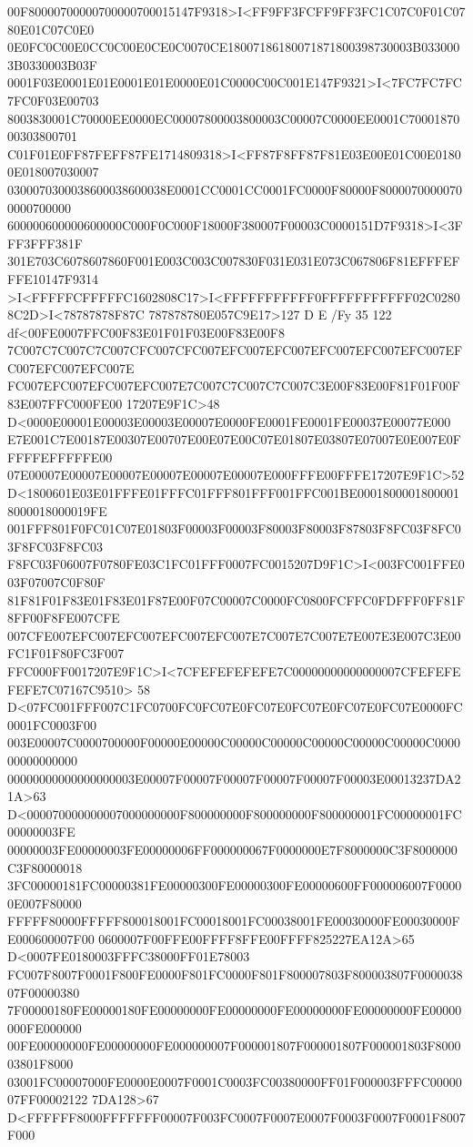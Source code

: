 00F80000700000700000700015147F9318>I<FF9FF3FCFF9FF3FC1C07C0F01C0780E01C07C0E0
0E0FC0C00E0CC0C00E0CE0C0070CE18007186180071871800398730003B0330003B0330003B03F
0001F03E0001E01E0001E01E0000E01C0000C00C001E147F9321>I<7FC7FC7FC7FC0F03E00703
8003830001C70000EE0000EC00007800003800003C00007C0000EE0001C7000187000303800701
C01F01E0FF87FEFF87FE1714809318>I<FF87F8FF87F81E03E00E01C00E01800E018007030007
0300070300038600038600038E0001CC0001CC0001FC0000F80000F80000700000700000700000
600000600000600000C000F0C000F18000F380007F00003C0000151D7F9318>I<3FFF3FFF381F
301E703C6078607860F001E003C003C007830F031E031E073C067806F81EFFFEFFFE10147F9314
>I<FFFFFCFFFFFC1602808C17>I<FFFFFFFFFFF0FFFFFFFFFFF02C02808C2D>I<78787878F87C
787878780E057C9E17>127 D E /Fy 35 122 df<00FE0007FFC00F83E01F01F03E00F83E00F8
7C007C7C007C7C007CFC007CFC007EFC007EFC007EFC007EFC007EFC007EFC007EFC007EFC007E
FC007EFC007EFC007EFC007E7C007C7C007C7C007C3E00F83E00F81F01F00F83E007FFC000FE00
17207E9F1C>48 D<0000E00001E00003E00003E00007E0000FE0001FE0001FE00037E00077E000
E7E001C7E00187E00307E00707E00E07E00C07E01807E03807E07007E0E007E0FFFFFEFFFFFE00
07E00007E00007E00007E00007E00007E00007E000FFFE00FFFE17207E9F1C>52
D<1800601E03E01FFFE01FFFC01FFF801FFF001FFC001BE00018000018000018000018000019FE
001FFF801F0FC01C07E01803F00003F00003F80003F80003F87803F8FC03F8FC03F8FC03F8FC03
F8FC03F06007F0780FE03C1FC01FFF0007FC0015207D9F1C>I<003FC001FFE003F07007C0F80F
81F81F01F83E01F83E01F87E00F07C00007C0000FC0800FCFFC0FDFFF0FF81F8FF00F8FE007CFE
007CFE007EFC007EFC007EFC007EFC007E7C007E7C007E7E007E3E007C3E00FC1F01F80FC3F007
FFC000FF0017207E9F1C>I<7CFEFEFEFEFE7C00000000000000007CFEFEFEFEFE7C07167C9510>
58 D<07FC001FFF007C1FC0700FC0FC07E0FC07E0FC07E0FC07E0FC07E0000FC0001FC0003F00
003E00007C0000700000F00000E00000C00000C00000C00000C00000C00000C000000000000000
00000000000000000003E00007F00007F00007F00007F00007F00003E00013237DA21A>63
D<000070000000007000000000F800000000F800000000F800000001FC00000001FC00000003FE
00000003FE00000003FE00000006FF000000067F0000000E7F8000000C3F8000000C3F80000018
3FC00000181FC00000381FE00000300FE00000300FE00000600FF000006007F00000E007F80000
FFFFF80000FFFFF800018001FC00018001FC00038001FE00030000FE00030000FE000600007F00
0600007F00FFE00FFFF8FFE00FFFF825227EA12A>65 D<0007FE0180003FFFC38000FF01E78003
FC007F8007F0001F800FE0000F801FC0000F801F800007803F800003807F000003807F00000380
7F00000180FE00000180FE00000000FE00000000FE00000000FE00000000FE00000000FE000000
00FE00000000FE00000000FE000000007F000001807F000001807F000001803F800003801F8000
03001FC00007000FE0000E0007F0001C0003FC00380000FF01F000003FFFC0000007FF00002122
7DA128>67 D<FFFFFF8000FFFFFFF00007F003FC0007F0007E0007F0003F0007F0001F8007F000
